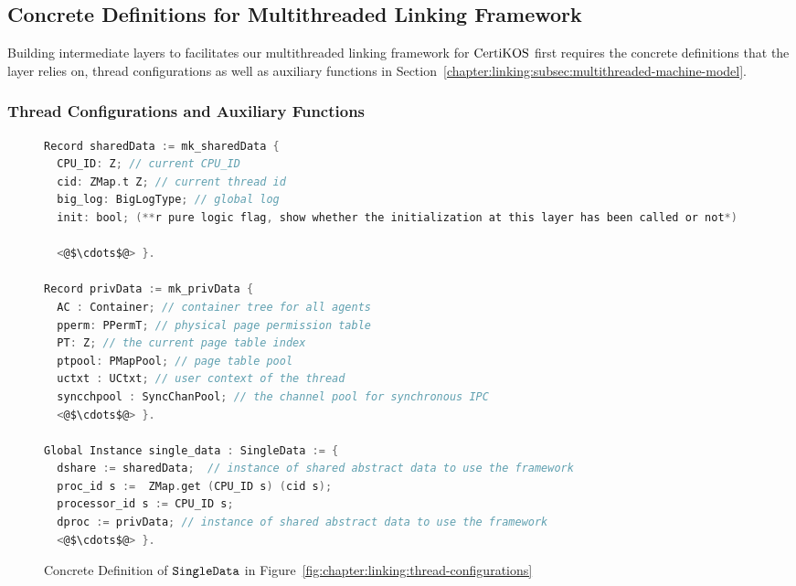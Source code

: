 \subsection{Concrete Definitions for Multithreaded Linking Framework} 
\label{chapter:certikos:phbthread}

Building intermediate layers to facilitates our multithreaded linking framework 
for $\mathrm{CertiKOS}$ first requires the concrete definitions 
that the layer relies on, 
thread configurations as well as auxiliary functions in Section~\ref{chapter:linking:subsec:multithreaded-machine-model}.

\subsubsection{Thread Configurations and Auxiliary Functions}

\begin{figure}
\begin{lstlisting}[language=C]
Record sharedData := mk_sharedData {
  CPU_ID: Z; // current CPU_ID 
  cid: ZMap.t Z; // current thread id
  big_log: BigLogType; // global log
  init: bool; (**r pure logic flag, show whether the initialization at this layer has been called or not*)

  <@$\cdots$@> }.

Record privData := mk_privData {
  AC : Container; // container tree for all agents
  pperm: PPermT; // physical page permission table 
  PT: Z; // the current page table index
  ptpool: PMapPool; // page table pool
  uctxt : UCtxt; // user context of the thread
  syncchpool : SyncChanPool; // the channel pool for synchronous IPC
  <@$\cdots$@> }.

Global Instance single_data : SingleData := {
  dshare := sharedData;  // instance of shared abstract data to use the framework
  proc_id s :=  ZMap.get (CPU_ID s) (cid s);
  processor_id s := CPU_ID s;
  dproc := privData; // instance of shared abstract data to use the framework
  <@$\cdots$@> }.
\end{lstlisting}
\caption{Concrete Definition of ${\mathrm{\texttt{SingleData}}}$ in Figure~\ref{fig:chapter:linking:thread-configurations}}
\label{fig:chapter:certikos:single-data-of-multithreaded-linking-certikos}
\end{figure}


